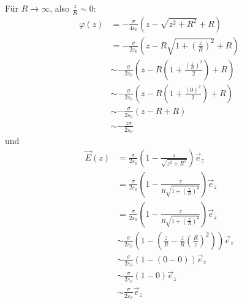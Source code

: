 \documentclass[sectionformat=aufgabe]{gadsescript}
\begin{document}
\begin{enumerate}[label=\alph*)]
		
		Für $ R \to \infty $, also $ \frac{ z }{ R } \sim 0 $:
		\begin{align*}
			\varphi(z) &= -\frac{ \sigma }{ 4 \varepsilon _0 } \left( z - \sqrt{z^2 + R^2} + R \right) \\
			 &= -\frac{ \sigma }{ 2 \varepsilon _0 } \left( z - R\sqrt{1 + \left( \frac{ z }{ R }  \right) ^2} + R \right) \\
			 &\sim -\frac{ \sigma }{ 2 \varepsilon _0 } \left( z - R\left( 1 + \frac{ \left( \frac{ z }{ R }  \right) ^2 }{ 2 } \right) + R \right) \\
			 &\sim -\frac{ \sigma }{ 2 \varepsilon _0 } \left( z - R\left( 1 + \frac{ \left( 0 \right) ^2 }{ 2 } \right) + R \right) \\
			 &\sim -\frac{ \sigma }{ 2 \varepsilon _0 } \left( z - R + R \right) \\
			 &\sim -\frac{ z\sigma }{ 2 \varepsilon _0 } 
		\end{align*}
		und
		\begin{align*}
			\vec E(z) &= \frac{ \sigma }{ 2 \varepsilon _0 } \left( 1 - \frac{z}{ \sqrt{z^2 + R^2}  } \right) \vec e_z \\
			&= \frac{ \sigma }{ 2 \varepsilon _0 } \left( 1 - \frac{z}{ R \sqrt{1 + \left( \frac{ z }{ R }  \right) ^2}  } \right) \vec e_z \\
			&= \frac{ \sigma }{ 2 \varepsilon _0 } \left( 1 - \frac{z}{ R\sqrt{1 + \left( \frac{ z }{ R }  \right) ^2}  } \right) \vec e_z \\
			&\sim \frac{ \sigma }{ 2 \varepsilon _0 } \left( 1 - \left( \frac{ z }{ R }  - \frac{ z }{ R }  \left( \frac{ R }{ z }  \right) ^2 \right) \right) \vec e_z \\
			&\sim \frac{ \sigma }{ 2 \varepsilon _0 } \left( 1 - \left( 0 - 0 \right)\right) \vec e_z \\
			&\sim \frac{ \sigma }{ 2 \varepsilon _0 } \left( 1 - 0 \right) \vec e_z \\
			&\sim \frac{ \sigma }{ 2 \varepsilon _0 } \vec e_z
		\end{align*}
\end{enumerate}
\end{document}
